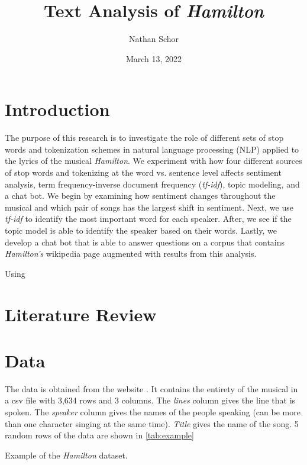 \documentclass{article}
\title{Text Analysis of \emph{Hamilton}}
\author{Nathan Schor}
\date{March 13, 2022}
\begin{document}
\maketitle
\tableofcontents
\listoffigures

\section{Introduction}

The purpose of this research is to investigate the role of different sets of stop words and tokenization schemes in natural language processing (NLP) applied to the lyrics of the musical \emph{Hamilton}. We experiment with how four different sources of stop words and tokenizing at the word vs. sentence level affects sentiment analysis, term frequency-inverse document frequency (\emph{tf-idf}), topic modeling, and a chat bot. We begin by examining how sentiment changes throughout the musical and which pair of songs has the largest shift in sentiment. Next, we use \emph{tf-idf} to identify the most important word for each speaker. After, we see if the topic model is able to identify the speaker based on their words. Lastly, we develop a chat bot that is able to answer questions on a corpus that contains \emph{Hamilton's} wikipedia page augmented with results from this analysis. 

Using \cite{Silge2022}




\section{Literature Review}



\section{Data}

The data is obtained from the website \cite{Kaggle2019}. It contains the entirety of the musical in a csv file with 3,634 rows and 3 columns. The \emph{lines} column gives the line that is spoken. The \emph{speaker} column gives the names of the people speaking (can be more than one character singing at the same time). \emph{Title} gives the name of the song. 5 random rows of the data are shown in \ref{tab:example}

\begin{table}
\caption{Example of the \emph{Hamilton} dataset.}
\label{tab:example}

\end{table}
\end{document}
